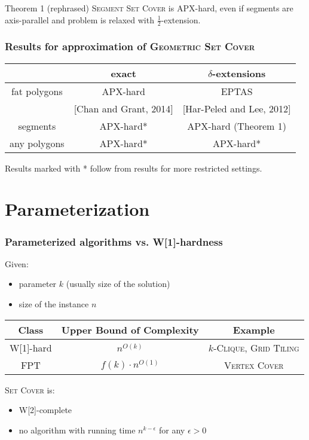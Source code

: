 \documentclass{beamer}
\begin{document}
\begin{frame}
\begin{block}{Theorem 1 (rephrased)}
	\textsc{Segment Set Cover} is APX-hard, even if segments are axis-parallel
	and problem is relaxed with $\frac{1}{2}$-extension.
\end{block}


\end{frame}


\begin{frame}
\frametitle{Results for approximation of \textsc{Geometric Set Cover}}
\begin{tabular}{|c|c|c|}
\hline
           & exact & $\delta$-extensions \\
\hline
fat polygons & APX-hard  &  EPTAS \\
& [Chan and Grant, 2014] & [Har-Peled and Lee, 2012] \\
\hline
segments & \textcolor{olivegreen}{APX-hard*} & \textcolor{olivegreen}{APX-hard (Theorem 1)} \\
\hline
any polygons & APX-hard* &  \textcolor{olivegreen}{APX-hard*} \\
\hline
\end{tabular}

\bigskip
Results marked with * follow from results for more restricted settings.

\end{frame}

\section{Parameterization}

\begin{frame}
\frametitle{Parameterized algorithms vs. W[1]-hardness}
Given:
\begin{itemize}
\item parameter $k$ (usually size of the solution)
\item size of the instance $n$
\end{itemize}
\bigskip

\begin{tabular}{|c|c|c|}
\hline
\textbf{Class} & \textbf{Upper Bound of Complexity} & \textbf{Example}\\
\hline
W[1]-hard & $n^{O(k)}$ & \textsc{$k$-Clique}, \textsc{Grid Tiling}\\
\hline
FPT & $f(k) \cdot n^{O(1)}$ & \textsc{Vertex Cover}\\
\hline
\end{tabular}

\bigskip
\textsc{Set Cover} is:
\begin{itemize}
\item W[2]-complete
\item no algorithm with running time $n^{k-\epsilon}$ for any $\epsilon > 0$
\end{itemize}
\end{frame}
\end{document}
